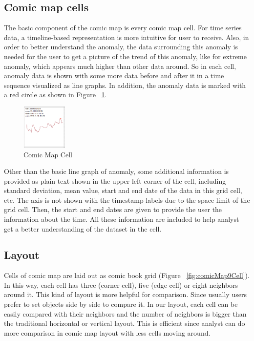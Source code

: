 \documentclass{vgtc}                          %
\begin{document}
\subsection{Comic map cells}

The basic component of the comic map is every comic map cell. For time series data, a timeline-based representation is more intuitive for user to receive. Also, in order to better understand the anomaly, the data surrounding this anomaly is needed for the user to get a picture of the trend of this anomaly, like for extreme anomaly, which appears much higher than other data around. So in each cell, anomaly data is shown with some more data before and after it in a time sequence visualized as line graphs. In addition, the anomaly data is marked with a red circle as shown in Figure ~\ref{fig:onecell}.

\begin{figure}[htb]
	\centering
	\includegraphics[width=0.20\textwidth]{onecell.jpg}
	\caption{Comic Map Cell}
	\label{fig:onecell}
\end{figure}

Other than the basic line graph of anomaly, some additional information is provided as plain text shown in the upper left corner of the cell, including standard deviation, mean value, start and end date of the data in this grid cell, etc. The axis is not shown with the timestamp labels due to the space limit of the grid cell. Then, the start and end dates are given to provide the user the information about the time. All these information are included to help analyst get a better understanding of the dataset in the cell.

\subsection{Layout}
Cells of comic map are laid out as comic book grid (Figure ~\ref{fig:comicMap9Cell}). In this way, each cell has three (corner cell), five (edge cell) or eight neighbors around it. This kind of layout is more helpful for comparison. Since usually users prefer to set objects side by side to compare it. In our layout, each cell can be easily compared with their neighbors and the number of neighbors is bigger than the traditional horizontal or vertical layout. This is efficient since analyst can do more comparison in comic map layout with less cells moving around.
\end{document}
